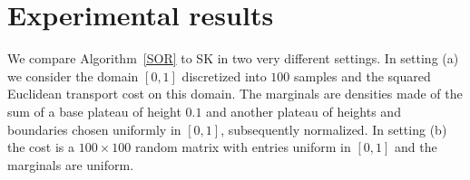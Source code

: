 \documentclass{article} %
\renewcommand{\epsilon}{\varepsilon}
\theoremstyle{plain}
\theoremstyle{definition}
\theoremstyle{remark}
\begin{document}
    

\section{Experimental results}
We compare Algorithm~\ref{SOR} to SK in two very different settings.
In setting (a) we consider the domain $[0,1]$ discretized into $100$ samples and the squared Euclidean transport cost on this domain.
The marginals are densities made of the sum of a base plateau of height $0.1$ and another plateau of heights and boundaries chosen uniformly in $[0,1]$, subsequently normalized.
In setting (b) the cost is a $100\times 100$ random matrix with entries uniform in $[0,1]$ and the marginals are uniform.
\end{document}
